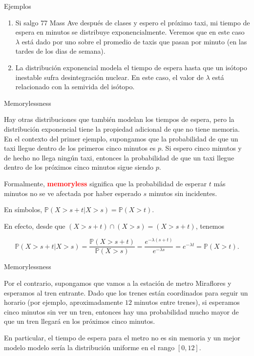 \documentclass[10pt]{beamer}
\begin{document}
\begin{frame}{Ejemplos}
\small{
\begin{enumerate}
\item Si salgo  77 Mass Ave después de  clases y espero el pr\'oximo taxi, mi tiempo de espera en minutos se distribuye exponencialmente. Veremos que en este caso $\lambda$ est\'a dado por uno sobre el promedio de taxis que pasan por minuto (en las tardes de los dias de semana).
\item La distribuci\'on exponencial modela el tiempo de espera hasta que un is\'otopo inestable sufra desintegraci\'on nuclear. En este caso, el valor de $\lambda $ est\'a relacionado con la semivida del is\'otopo.
\end{enumerate}

\vspace{2.5 cm}

}
\end{frame}

\begin{frame}{Memorylessness}
\small{Hay otras distribuciones que tambi\'en modelan los tiempos de espera, pero la distribuci\'on exponencial tiene la propiedad adicional de que no tiene memoria. En el contexto del primer ejemplo, supongamos que la probabilidad de que un taxi llegue dentro de los primeros cinco minutos es $p$. Si espero cinco minutos y de hecho no llega ning\'un taxi, entonces la probabilidad de que un taxi llegue dentro de los pr\'oximos cinco minutos sigue siendo $p$.
	

Formalmente, \textcolor{red}{\textbf{memoryless}} significa que la probabilidad de esperar $t$ m\'as minutos no se ve afectada por haber esperado $s$ minutos sin incidentes.

\vspace{0.2cm}

En s\'imbolos, $\mathbb{P}(X > s +t| X > s) = \mathbb{P}(X > t)$.

\vspace{0.2cm}


En efecto, desde que $(X >  s + t) \cap (X > s) = (X > s+ t)$, tenemos

\[
\mathbb{P}(X > s +t| X > s) = \frac{\mathbb{P}(X > s +t) }{\mathbb{P}(X > s) } = \frac{e^{-\lambda(s + t)}}{e^{-\lambda s}} = e^{-\lambda t} = \mathbb{P}(X > t).
\]

}
\end{frame}

\begin{frame}{Memorylessness}
\small{Por el contrario, supongamos que vamos a la estaci\'on de metro Miraflores y esperamos  al tren entrante. Dado que los trenes est\'an coordinados para seguir un horario (por ejemplo, aproximadamente $12$ minutos entre  trenes), si esperamos cinco minutos sin ver un tren, entonces hay una probabilidad mucho mayor de que un tren llegar\'a en los pr\'oximos cinco minutos.
	
En particular, el tiempo de espera para el metro no es sin memoria y un mejor modelo modelo  ser\'ia la distribuci\'on uniforme en el rango $[0,12]$.

\vspace{2.5cm}

}
\end{frame}
\end{document}
